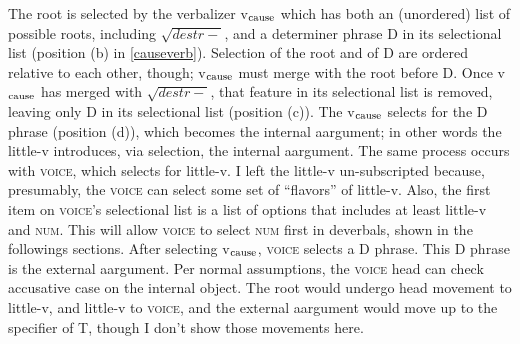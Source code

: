 \documentclass[12pt]{article}
\newcommand*{\textsub}[1]{\ensuremath{_\textrm{{\scriptsize #1}}}}
\begin{document}
\vspace*{-10pt}
\par \hfill \par

\doublespacing

\noindent The root is selected by the verbalizer v\textsub{cause} which has both an (unordered) list of possible roots, including $\sqrt{destr-}$, and a determiner phrase D in its selectional list (position (b) in \ref{causeverb}). Selection of the root and of D are ordered relative to each other, though; v\textsub{cause} must merge with the root before D. Once v\textsub{cause} has merged with $\sqrt{destr-}$, that feature in its selectional list is removed, leaving only D in its selectional list (position (c)). The v\textsub{cause} selects for the D phrase (position (d)), which becomes the internal aargument; in other words the little-v introduces, via selection, the internal aargument. The same process occurs with \textsc{voice}, which selects for little-v. I left the little-v un-subscripted because, presumably, the \textsc{voice} can select some set of ``flavors'' of little-v. Also, the first item on \textsc{voice}'s selectional list is a list of options that includes at least little-v and \textsc{num}. This will allow \textsc{voice} to select \textsc{num} first in deverbals, shown in the followings sections. After selecting v\textsub{cause}, \textsc{voice} selects a D phrase. This D phrase is the external aargument. Per normal assumptions, the \textsc{voice} head can check accusative case on the internal object. The root would undergo head movement to little-v, and little-v to \textsc{voice}, and the external aargument would move up to the specifier of T, though I don't show those movements here.
\end{document}
